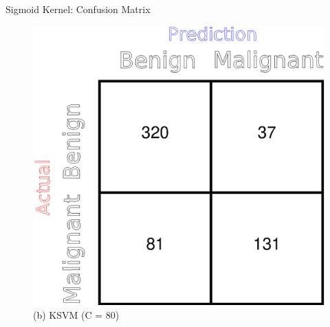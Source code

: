 \documentclass[xcolor=dvipsnames]{beamer}
\begin{document}
\begin{frame}{Sigmoid Kernel: Confusion Matrix}
\begin{figure}[H]
\begin{minipage}[t]{0.5\linewidth}
    \includegraphics[trim={9cm 0cm 0cm 0cm},clip,scale=0.43]{Figures/KSVM_Sigmoid_CM.eps}
    \caption*{(b) KSVM (C = 80)}
\end{minipage} 
\end{figure}
\end{frame}
\end{document}
